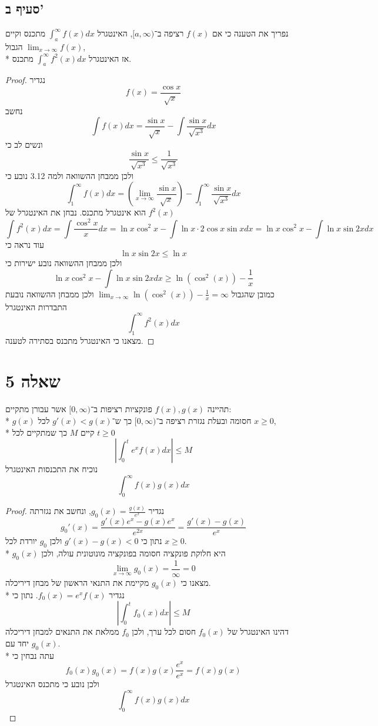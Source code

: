 \subsection{סעיף ב'}
נפריך את הטענה כי
אם $f(x)$ רציפה ב־$[a, \infty)$, האינטגרל $\displaystyle\int_a^\infty f(x) dx$ מתכנס וקיים הגבול $\displaystyle\lim_{x \to \infty} f(x)$, \\* %
אז האינטגרל $\displaystyle\int_a^\infty f^2(x) dx$ מתכנס.
\begin{proof}
	נגדיר
	\[
		f(x) = \frac{\cos x}{\sqrt{x}}
	\]
	נחשב
	\[
		\int f(x) dx = \frac{\sin x}{\sqrt{x}} - \int \frac{\sin x}{\sqrt{x^3}} dx
	\]
	ונשים לב כי
	\[
		\frac{\sin x}{\sqrt{x^3}} \le \frac{1}{\sqrt{x^3}}
	\]
	ולכן ממבחן ההשוואה ולמה 3.12 נובע כי
	\[
		\int_1^\infty f(x) dx = \left( \lim_{x \to \infty} \frac{\sin x}{\sqrt{x}} \right) - \int_1^\infty \frac{\sin x}{\sqrt{x^3}} dx
	\]
	הוא אינטגרל מתכנס. נבחן את האינטגרל של $f^2(x)$
	\[
		\int f^2(x) dx
		= \int \frac{\cos^2 x}{x} dx
		= \ln x \cos^2 x - \int \ln x \cdot 2 \cos x \sin x dx
		= \ln x \cos^2 x - \int \ln x \sin 2x dx
	\]
	עוד נראה כי
	\[
		\ln x \sin 2x \le \ln x
	\]
	ולכן ממבחן ההשוואה נובע ישירות כי
	\[
		\ln x \cos^2 x - \int \ln x \sin 2x dx \ge \ln (\cos^2(x)) - \frac{1}{x}
	\]
	כמובן שהגבול $\lim_{x \to \infty} \ln (\cos^2(x)) - \frac{1}{x} = \infty$ ולכן ממבחן ההשוואה נובעת התבדרות האינטגרל
	\[
		\int_1^\infty f^2(x) dx
	\]
	מצאנו כי האינטגרל מתכנס בסתירה לטענה.
\end{proof}

\section{שאלה 5}
תהיינה $f(x), g(x)$ פונקציות רציפות ב־$[0, \infty)$ אשר עבורן מתקיים: \\* %
$g(x)$ חסומה ובעלת נגזרת רציפה ב־$[0, \infty)$ כך ש־$g'(x) < g(x)$ לכל $x \ge 0$, \\* %
קיים $M$ כך שמתקיים לכל $t \ge 0$
\[
	\left\lvert \int_0^t e^x f(x) dx \right\rvert \le M
\]
נוכיח את התכנסות האינטגרל
\[
	\int_0^\infty f(x) g(x) dx
\]
\begin{proof}
	נגדיר $g_0(x) = \frac{g(x)}{e^x}$, ונחשב את נגזרתה
	\[
		g_0'(x) = \frac{g'(x) e^x - g(x) e^x}{e^{2x}} = \frac{g'(x) - g(x)}{e^x}
	\]
	נתון כי $g'(x) - g(x) < 0$ ולכן $g_0$ יורדת לכל $x \ge 0$. \\*
	$g_0(x)$ היא חלוקת פונקציה חסומה בפונקציה מונוטונית עולה, ולכן
	\[
		\lim_{x \to \infty} g_0(x) = \frac{1}{\infty} = 0
	\]
	מצאנו כי $g_0(x)$ מקיימת את התנאי הראשון של מבחן דיריכלה. \\*
	נגדיר $f_0(x) = e^x f(x)$. נתון כי
	\[
		\left\lvert \int_0^t f_0(x) dx \right\rvert \le M
	\]
	דהינו האינטגרל של $f_0(x)$ חסום לכל ערך,
	ולכן $f_0$ ממלאת את התנאים למבחן דיריכלה יחד עם $g_0(x)$. \\*
	עתה נבחין כי
	\[
		f_0(x) g_0(x) = f(x) g(x) \frac{e^x}{e^x} = f(x) g(x)
	\]
	ולכן נובע כי מתכנס האינטגרל
	\[
		\int_0^\infty f(x) g(x) dx
	\]
\end{proof}

